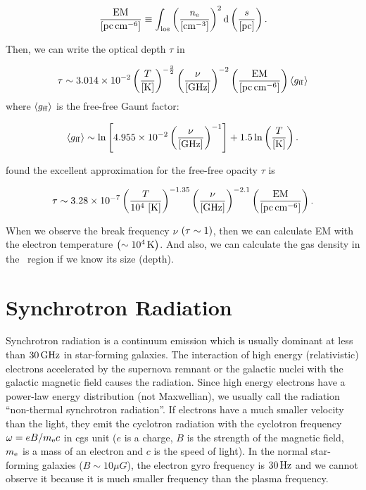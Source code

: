 \begin{equation}\label{eq:essential_radio4n57}
    \frac{\mathrm{EM}}{\left[\mathrm{pc} \, \mathrm{cm}^{-6}\right]} \equiv \int_{\mathrm{los}}\left(\frac{n_{\mathrm{e}}}{\left[\mathrm{cm}^{-3}\right]}\right)^2 \mathrm{d}\left(\frac{s}{\left[\mathrm{pc}\right]}\right).
\end{equation}

Then, we can write the optical depth $\tau$ in

\begin{equation}\label{eq:essential_radio4n58}
    \tau \sim 3.014 \times 10^{-2}\left(\frac{T}{\left[\mathrm{K}\right]}\right)^{-\frac{3}{2}}\left(\frac{\nu}{\left[\mathrm{GHz}\right]}\right)^{-2}\left(\frac{\mathrm{EM}}{\left[\mathrm{pc}\,\mathrm{cm}^{-6}\right]}\right)\left\langle g_{\mathrm{ff}}\right\rangle
\end{equation}
where $\left\langle g_{\mathrm{ff}}\right\rangle$ is the free-free Gaunt factor:

\begin{equation}\label{eq:essential_radio4n59}
    \left\langle g_{\mathrm{ff}}\right\rangle \sim \ln \left[4.955 \times 10^{-2}\left(\frac{\nu}{\left[\mathrm{GHz}\right]}\right)^{-1}\right]+1.5 \ln \left(\frac{T}{\left[\mathrm{K}\right]}\right).
\end{equation}

\citet{Mezger1967} found the excellent approximation for the free-free opacity $\tau$ is

\begin{equation}\label{eq:essential_radio4n60}
    \tau \sim 3.28 \times 10^{-7}\left(\frac{T}{10^4\,\left[\mathrm{K}\right]}\right)^{-1.35}\left(\frac{\nu}{\left[\mathrm{GHz}\right]}\right)^{-2.1}\left(\frac{\mathrm{EM}}{\left[\mathrm{pc} \, \mathrm{cm}^{-6}\right]}\right).
\end{equation}

When we observe the break frequency $\nu$ $\left(\tau \sim 1\right)$, then we can calculate EM with the electron temperature $\left(\sim10^4\,\mathrm{K}\right)$.
And also, we can calculate the gas density in the \ih~region if we know its size (depth).





\section{Synchrotron Radiation}\label{sec:synchrotronradiation}

Synchrotron radiation is a continuum emission which is usually dominant at less than $30\,\mathrm{GHz}$ in star-forming galaxies.
The interaction of high energy (relativistic) electrons accelerated by the supernova remnant or the galactic nuclei with the galactic magnetic field causes the radiation.
Since high energy electrons have a power-law energy distribution (not Maxwellian), we usually call the radiation ``non-thermal synchrotron radiation''.
If electrons have a much smaller velocity than the light, they emit the cyclotron radiation with the cyclotron frequency $\omega = eB / m_{\mathrm{e}}c$ in cgs unit ($e$ is a charge, $B$ is the strength of the magnetic field, $m_{\mathrm{e}}$ is a mass of an electron and $c$ is the speed of light).
In the normal star-forming galaxies ($B\sim10\mu G$), the electron gyro frequency is $30\,\mathrm{Hz}$ and we cannot observe it because it is much smaller frequency than the plasma frequency.


